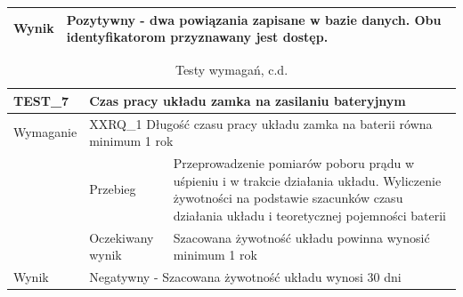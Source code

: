 \begin{table}[h!]
\begin{subtable}[c]{\textwidth}
\begin{tabular}{|p{2cm}|p{}|p{}|}
                    \cellcolor[gray]{0.8} Wynik                 & \multicolumn{2}{p{12cm}|}{Pozytywny - dwa powiązania zapisane w bazie danych. Obu identyfikatorom przyznawany jest dostęp.}                                                                                  \\ \hline
                    \end{tabular}%
                \label{tbl:test6}
                \vspace{10mm}
            \end{subtable}
            \label{tbl:tests}
        \end{table}

        \pagebreak

        \begin{table}[h!]
            \ContinuedFloat
            \caption{Testy wymagań, c.d.}
            \begin{subtable}[c]{\textwidth}
                \centering
                    \begin{tabular}{|p{2cm}|p{}|p{}|}
                    \hline
                    TEST\_7               & \multicolumn{2}{l|}{\textbf{Czas pracy układu zamka na zasilaniu bateryjnym}}                                                            \\ \hline
                    \cellcolor[gray]{0.8} Wymaganie             & \multicolumn{2}{p{12cm}|}{XXRQ\_1 Długość czasu pracy układu zamka na baterii równa minimum 1 rok }                                                                                    \\ \hline
                    \cellcolor[gray]{0.8} \multirow{2}{*}{Opis} & Przebieg           & Przeprowadzenie pomiarów poboru prądu w uśpieniu i w trakcie działania układu. Wyliczenie żywotności na podstawie szacunków czasu działania układu i teoretycznej pojemności baterii\\ \cline{2-3}
                    \cellcolor[gray]{0.8}                      & Oczekiwany wynik   & Szacowana żywotność układu powinna wynosić minimum 1 rok                                                 \\ \hline
                    \cellcolor[gray]{0.8} Wynik                 & \multicolumn{2}{p{12cm}|}{Negatywny - Szacowana żywotność układu wynosi 30 dni}                                                                                  \\ \hline
                    \end{tabular}%
                \label{tbl:test6}

\end{subtable}
\end{table}
